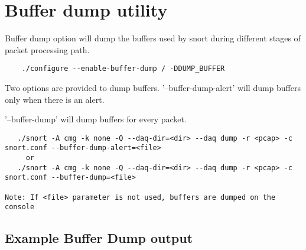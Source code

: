\documentclass[english]{report}
\begin{document}
\section{Buffer dump utility}

Buffer dump option will dump the buffers used by snort during different stages of packet processing path.

\begin{verbatim}
    ./configure --enable-buffer-dump / -DDUMP_BUFFER
\end{verbatim}

Two options are provided to dump buffers. '--buffer-dump-alert' will dump buffers only when there is an alert.

'--buffer-dump' will dump buffers for every packet.

\begin{verbatim}
   ./snort -A cmg -k none -Q --daq-dir=<dir> --daq dump -r <pcap> -c snort.conf --buffer-dump-alert=<file>
     or
   ./snort -A cmg -k none -Q --daq-dir=<dir> --daq dump -r <pcap> -c snort.conf --buffer-dump=<file>

Note: If <file> parameter is not used, buffers are dumped on the console
\end{verbatim}

\subsection{Example Buffer Dump output}
\end{document}

